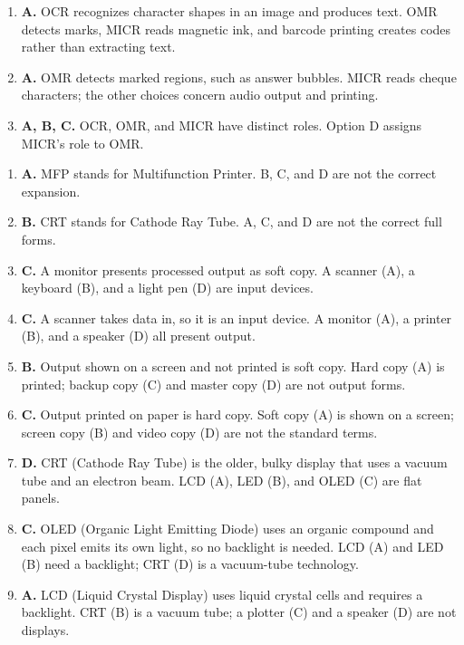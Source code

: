 \begin{enumerate}[label=\textbf{Q\arabic*.}, leftmargin=*]
\item \textbf{A.} OCR recognizes character shapes in an image and produces text. OMR detects marks, MICR reads magnetic ink, and barcode printing creates codes rather than extracting text.

\item \textbf{A.} OMR detects marked regions, such as answer bubbles. MICR reads cheque characters; the other choices concern audio output and printing.

\item \textbf{A, B, C.} OCR, OMR, and MICR have distinct roles. Option D assigns MICR's role to OMR.

\end{enumerate}
\begin{enumerate}[label=\textbf{Q\arabic*.}, leftmargin=*]
\item \textbf{A.} MFP stands for Multifunction Printer. B, C, and D are not
  the correct expansion.
\item \textbf{B.} CRT stands for Cathode Ray Tube. A, C, and D are not the
  correct full forms.
\item \textbf{C.} A monitor presents processed output as soft copy. A scanner
  (A), a keyboard (B), and a light pen (D) are input devices.
\item \textbf{C.} A scanner takes data in, so it is an input device. A monitor
  (A), a printer (B), and a speaker (D) all present output.
\item \textbf{B.} Output shown on a screen and not printed is soft copy. Hard
  copy (A) is printed; backup copy (C) and master copy (D) are not output
  forms.
\item \textbf{C.} Output printed on paper is hard copy. Soft copy (A) is shown
  on a screen; screen copy (B) and video copy (D) are not the standard terms.
\item \textbf{D.} CRT (Cathode Ray Tube) is the older, bulky display that uses
  a vacuum tube and an electron beam. LCD (A), LED (B), and OLED (C) are flat
  panels.
\item \textbf{C.} OLED (Organic Light Emitting Diode) uses an organic compound
  and each pixel emits its own light, so no backlight is needed. LCD (A) and
  LED (B) need a backlight; CRT (D) is a vacuum-tube technology.
\item \textbf{A.} LCD (Liquid Crystal Display) uses liquid crystal cells and
  requires a backlight. CRT (B) is a vacuum tube; a plotter (C) and a speaker
  (D) are not displays.

\end{enumerate}
